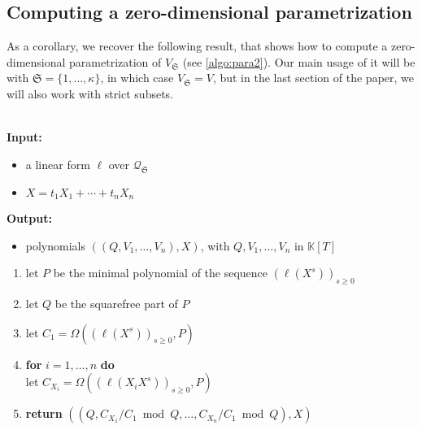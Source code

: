 \documentclass[final,1p,times,authoryear]{elsarticle}
\newcommand{\minpoly}{P}
\newcommand{\lf}{X}
\newcommand{\residueI}{\mathscr{Q}}
\newcommand{\sqfree}{Q}
\def\dg{\kappa}
\def\K{\mathbb{K}}
\def\K {\ensuremath{\mathbb{K}}}
\begin{document}

\subsection{Computing a zero-dimensional parametrization}  \label{ssec:abstractlago}

As a corollary, we recover the following result, that shows how to compute a
zero-dimensional parametrization of $V_{\mathfrak{S}}$ (see \cref{algo:para2}).
Our main usage of it will be with $\mathfrak{S}=\{1,\dots,\dg\}$, in which case
$V_{\mathfrak{S}}=V$, but in the last section of the paper, we will also work
with strict subsets. 

\begin{algorithm}[ht]
  \caption{$\mathsf{Parametrization}(\ell,\lf)$}  ~\\
  {\bf Input:} \vspace{-0.5em}
  \begin{itemize}\setlength\itemsep{0em}
    \item  a linear form $\ell$ over $\residueI_\mathfrak{S}$
    \item $\lf=t_1 X_1 + \cdots + t_n X_n$
  \end{itemize}
  {\bf Output:}  \vspace{-0.5em}
  \begin{itemize}
    \item              polynomials $((\sqfree,V_1,\dots,V_n),\lf)$, with $\sqfree,V_1,\dots,V_n$ in $\K[T]$
  \end{itemize}
  \begin{enumerate}\setlength\itemsep{0em}
    \item let $\minpoly$ be the minimal polynomial of the sequence $(\ell(\lf^s))_{s \ge 0}$
    \item let $\sqfree$ be the squarefree part of $\minpoly$
    \item let $C_1 = \Omega((\ell(\lf^s))_{s\ge0} ,\minpoly)$
    \item \textbf{for} $i=1,\dots,n$ \textbf{do} \\
      \phantom{for} let $C_{X_i} = \Omega((\ell(X_i \lf^s))_{s\ge0}, \minpoly)$ 
    \item \textbf{return} $((\sqfree, C_{X_1}/ C_1 \bmod \sqfree, \dots, C_{X_n}/ C_{1} \bmod \sqfree),\lf)$
  \end{enumerate}
  \label{algo:para2}
\end{algorithm}
\end{document}
